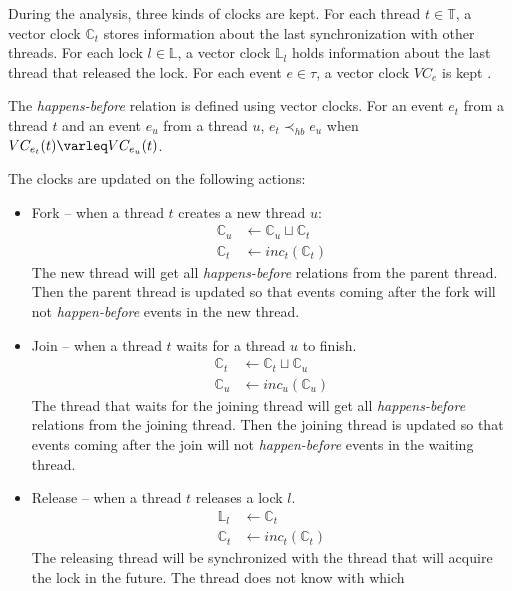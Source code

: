 During the analysis, three kinds of clocks are kept. For each thread $t \in
\mathbb{T}$, a vector clock $\mathbb{C}_t$ stores information about the last
synchronization with other threads. For each lock $l \in \mathbb{L}$, a vector
clock $\mathbb{L}_l$ holds information about the last thread that released the
lock. For each event $e \in \tau$, a vector clock $VC_e$ is kept
\cite{contracts}.

The \emph{happens-before} relation is defined using vector clocks. For an event
$e_t$ from a thread $t$ and an event $e_u$ from a thread $u$, $e_t \prec_{hb}
e_u$ when $VC_{e_t}(t) \varleq VC_{e_u}(t)$.

The clocks are updated on the following actions:
\begin{itemize}
    \item Fork -- when a thread $t$ creates a new thread $u$:
        \begin{align*}
            \mathbb{C}_u &\leftarrow \mathbb{C}_u \sqcup \mathbb{C}_t \\
            \mathbb{C}_t &\leftarrow inc_t(\mathbb{C}_t)
        \end{align*}
        The new thread will get all \emph{happens-before} relations from the
        parent thread. Then the parent thread is updated so that events coming
        after the fork will not \emph{happen-before} events in the new thread.
    \item Join -- when a thread $t$ waits for a thread $u$ to finish.
        \begin{align*}
            \mathbb{C}_t &\leftarrow \mathbb{C}_t \sqcup \mathbb{C}_u \\
            \mathbb{C}_u &\leftarrow inc_u(\mathbb{C}_u)
        \end{align*}
        The thread that waits for the joining thread will get all
        \emph{happens-before} relations from the joining thread. Then the
        joining thread is updated so that events coming after the join will not
        \emph{happen-before} events in the waiting thread.
    \item Release -- when a thread $t$ releases a lock $l$.
        \begin{align*}
            \mathbb{L}_l &\leftarrow \mathbb{C}_t \\
            \mathbb{C}_t &\leftarrow inc_t(\mathbb{C}_t)
        \end{align*}
        The releasing thread will be synchronized with the thread that will
        acquire the lock in the future. The thread does not know with which

\end{itemize}

